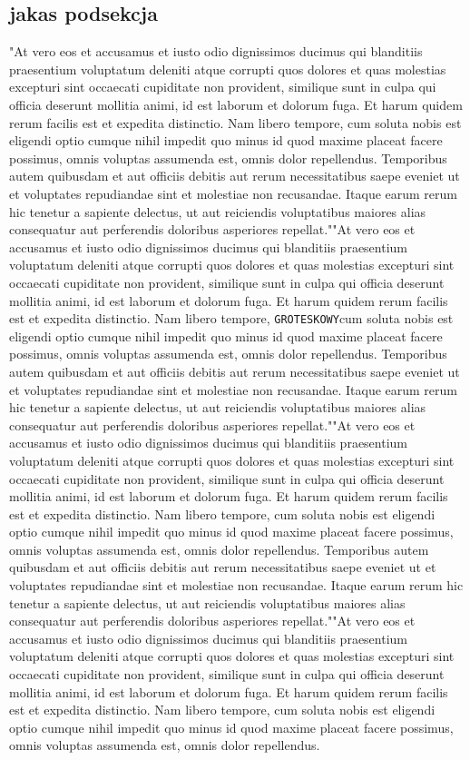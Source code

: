 \documentclass[12pt,a4paper]{article}
\begin{document}
\subsection{jakas podsekcja}
"At vero eos et accusamus et iusto odio dignissimos ducimus qui blanditiis praesentium voluptatum deleniti atque corrupti quos dolores et quas molestias excepturi sint occaecati cupiditate non provident, similique sunt in culpa qui officia deserunt mollitia animi, id est laborum et dolorum fuga. Et harum quidem rerum facilis est et expedita distinctio. Nam libero tempore, cum soluta nobis est eligendi optio cumque nihil impedit quo minus id quod maxime placeat facere possimus, omnis voluptas assumenda est, omnis dolor repellendus. Temporibus autem quibusdam et aut officiis debitis aut rerum necessitatibus saepe eveniet ut et voluptates repudiandae sint et molestiae non recusandae. Itaque earum rerum hic tenetur a sapiente delectus, ut aut reiciendis voluptatibus maiores alias consequatur aut perferendis doloribus asperiores repellat.""At vero eos et accusamus et iusto odio dignissimos ducimus qui blanditiis praesentium voluptatum deleniti atque corrupti quos dolores et quas molestias excepturi sint occaecati cupiditate non provident, similique sunt in culpa qui officia deserunt mollitia animi, id est laborum et dolorum fuga. Et harum quidem rerum facilis est et expedita distinctio. Nam libero tempore,  \texttt{GROTESKOWY}cum soluta nobis est eligendi optio cumque nihil impedit quo minus id quod maxime placeat facere possimus, omnis voluptas assumenda est, omnis dolor repellendus. Temporibus autem quibusdam et aut officiis debitis aut rerum necessitatibus saepe eveniet ut et voluptates repudiandae sint et molestiae non recusandae. Itaque earum rerum hic tenetur a sapiente delectus, ut aut reiciendis voluptatibus maiores alias consequatur aut perferendis doloribus asperiores repellat.""At vero eos et accusamus et iusto odio dignissimos ducimus qui blanditiis praesentium voluptatum deleniti atque corrupti quos dolores et quas molestias excepturi sint occaecati cupiditate non provident, similique sunt in culpa qui officia deserunt mollitia animi, id est laborum et dolorum fuga. Et harum quidem rerum facilis est et expedita distinctio. Nam libero tempore, cum soluta nobis est eligendi optio cumque nihil impedit quo minus id quod maxime placeat facere possimus, omnis voluptas assumenda est, omnis dolor repellendus. Temporibus autem quibusdam et aut officiis debitis aut rerum necessitatibus saepe eveniet ut et voluptates repudiandae sint et molestiae non recusandae. Itaque earum rerum hic tenetur a sapiente delectus, ut aut reiciendis voluptatibus maiores alias consequatur aut perferendis doloribus asperiores repellat.""At vero eos et accusamus et iusto odio dignissimos ducimus qui blanditiis praesentium voluptatum deleniti atque corrupti quos dolores et quas molestias excepturi sint occaecati cupiditate non provident, similique sunt in culpa qui officia deserunt mollitia animi, id est laborum et dolorum fuga. Et harum quidem rerum facilis est et expedita distinctio. Nam libero tempore, cum soluta nobis est eligendi optio cumque nihil impedit quo minus id quod maxime placeat facere possimus, omnis voluptas assumenda est, omnis dolor repellendus. 
\end{document}
